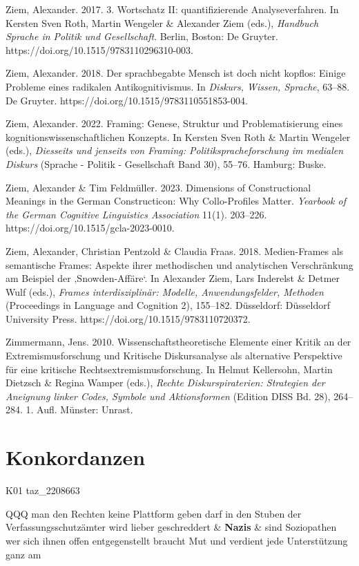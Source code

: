 Ziem, Alexander. 2017. 3. Wortschatz II: quantifizierende Analyseverfahren. In Kersten Sven Roth, Martin Wengeler \& Alexander Ziem (eds.), \emph{Handbuch Sprache in Politik und Gesellschaft}. Berlin, Boston: De Gruyter. https://doi.org/10.1515/9783110296310-003.

Ziem, Alexander. 2018. Der sprachbegabte Mensch ist doch nicht kopflos: Einige Probleme eines radikalen Antikognitivismus. In \emph{Diskurs, Wissen, Sprache}, 63--88. De Gruyter. https://doi.org/10.1515/9783110551853-004.

Ziem, Alexander. 2022. Framing: Genese, Struktur und Problematisierung eines kognitionswissenschaftlichen Konzepts. In Kersten Sven Roth \& Martin Wengeler (eds.), \emph{Diesseits und jenseits von Framing: Politikspracheforschung im medialen Diskurs} (Sprache - Politik - Gesellschaft Band 30), 55--76. Hamburg: Buske.

Ziem, Alexander \& Tim Feldmüller. 2023. Dimensions of Constructional Meanings in the German Constructicon: Why Collo-Profiles Matter. \emph{Yearbook of the German Cognitive Linguistics Association} 11(1). 203--226. https://doi.org/10.1515/gcla-2023-0010.

Ziem, Alexander, Christian Pentzold \& Claudia Fraas. 2018. Medien-Frames als semantische Frames: Aspekte ihrer methodischen und analytischen Verschränkung am Beispiel der ‚Snowden-Affäre`. In Alexander Ziem, Lars Inderelst \& Detmer Wulf (eds.), \emph{Frames interdisziplinär: Modelle, Anwendungsfelder, Methoden} (Proceedings in Language and Cognition 2), 155--182. Düsseldorf: Düsseldorf University Press. https://doi.org/10.1515/9783110720372.

Zimmermann, Jens. 2010. Wissenschaftstheoretische Elemente einer Kritik an der Extremismusforschung und Kritische Diskursanalyse als alternative Perspektive für eine kritische Rechtsextremismusforschung. In Helmut Kellersohn, Martin Dietzsch \& Regina Wamper (eds.), \emph{Rechte Diskurspiraterien: Strategien der Aneignung linker Codes, Symbole und Aktionsformen} (Edition DISS Bd. 28), 264--284. 1. Aufl. Münster: Unrast.

\section{Konkordanzen}\label{konkordanzen}


\begin{table}
K01 taz\_2208663
\begin{tabularx}{\textwidth}{QQQ}
man den Rechten keine Plattform geben darf in den Stuben der Verfassungsschutzämter wird lieber geschreddert & \textbf{Nazis} & sind Soziopathen wer sich ihnen offen entgegenstellt braucht Mut und verdient jede Unterstützung ganz am \\
\end{tabularx}
\end{table}


